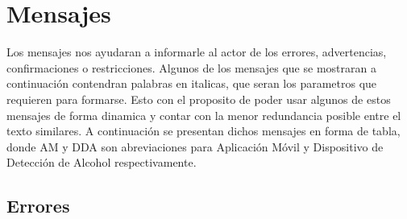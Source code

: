 \section{Mensajes}
Los mensajes nos ayudaran a informarle al actor de los errores, advertencias, confirmaciones o restricciones. Algunos de los mensajes que se mostraran a continuación contendran palabras en italicas, que seran los parametros que requieren para formarse. Esto con el proposito de poder usar algunos de estos mensajes de forma dinamica y contar con la menor redundancia posible entre el texto similares.  A continuación se presentan dichos mensajes en forma de tabla, donde AM y DDA son abreviaciones para Aplicación Móvil y Dispositivo de Detección de Alcohol respectivamente.
\subsection{Errores}
